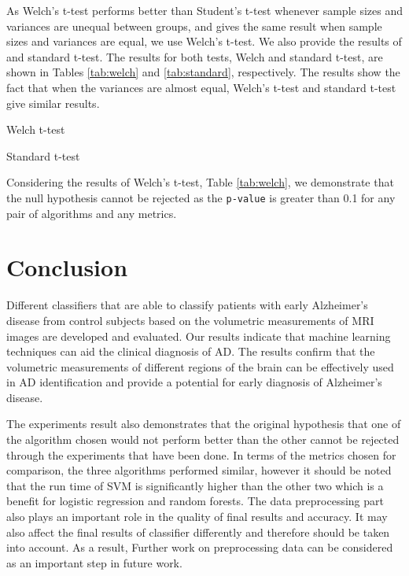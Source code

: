 As Welch's t-test performs better than Student's t-test whenever sample sizes and variances are unequal between groups, and gives the same result when sample sizes and variances are equal, we use Welch's t-test. We also provide the results of and standard t-test. The results for both tests, Welch and standard t-test, are shown in Tables \ref{tab:welch} and \ref{tab:standard}, respectively. The results show the fact that when the variances are almost equal, Welch's t-test and standard t-test give similar results.

\begin{table}
	\centering
	\caption{Welch t-test}
	\label{tab:welch}
\end{table}

\begin{table}
	\centering
	\caption{Standard t-test}
	\label{tab:standard}
\end{table}

Considering the results of Welch's t-test, Table \ref{tab:welch}, we demonstrate that the null hypothesis cannot be rejected as the \texttt{p-value} is greater than 0.1 for any pair of algorithms and any metrics.

\section{Conclusion}


Different classifiers that are able to classify patients with early Alzheimer’s disease from control subjects based on the volumetric measurements of MRI images are developed and evaluated. Our results indicate that machine learning techniques can aid the clinical diagnosis of AD. The results confirm that the volumetric measurements of different regions of the brain can be effectively used in AD identification and provide a potential for early diagnosis of Alzheimer’s disease. 

The experiments result also demonstrates that the original hypothesis that one of the algorithm chosen would not perform better than the other cannot be rejected through the experiments that have been done. In terms of the metrics chosen for comparison, the three algorithms performed similar, however it should be noted that the run time of SVM is significantly higher than the other two which is a benefit for logistic regression and random forests. The data preprocessing part also plays an important role in the quality of final results and accuracy. It may also affect the final results of classifier differently and therefore should be taken into account. As a result, Further work on preprocessing data can be considered as an important step in future work.


